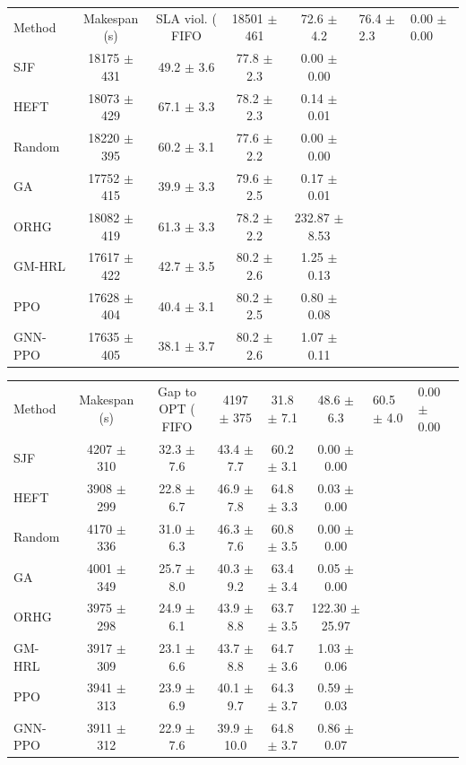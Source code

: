 \begin{tabular}{lcccc}
\toprule
Method & Makespan (s) & SLA viol. (%
\midrule
FIFO & 18501 $\pm$ 461 & 72.6 $\pm$ 4.2 & 76.4 $\pm$ 2.3 & 0.00 $\pm$ 0.00 \\
SJF & 18175 $\pm$ 431 & 49.2 $\pm$ 3.6 & 77.8 $\pm$ 2.3 & 0.00 $\pm$ 0.00 \\
HEFT & 18073 $\pm$ 429 & 67.1 $\pm$ 3.3 & 78.2 $\pm$ 2.3 & 0.14 $\pm$ 0.01 \\
Random & 18220 $\pm$ 395 & 60.2 $\pm$ 3.1 & 77.6 $\pm$ 2.2 & 0.00 $\pm$ 0.00 \\
GA & 17752 $\pm$ 415 & 39.9 $\pm$ 3.3 & 79.6 $\pm$ 2.5 & 0.17 $\pm$ 0.01 \\
ORHG & 18082 $\pm$ 419 & 61.3 $\pm$ 3.3 & 78.2 $\pm$ 2.2 & 232.87 $\pm$ 8.53 \\
GM-HRL & 17617 $\pm$ 422 & 42.7 $\pm$ 3.5 & 80.2 $\pm$ 2.6 & 1.25 $\pm$ 0.13 \\
PPO & 17628 $\pm$ 404 & 40.4 $\pm$ 3.1 & 80.2 $\pm$ 2.5 & 0.80 $\pm$ 0.08 \\
GNN-PPO & 17635 $\pm$ 405 & 38.1 $\pm$ 3.7 & 80.2 $\pm$ 2.6 & 1.07 $\pm$ 0.11 \\
\bottomrule
\end{tabular}

\begin{tabular}{lccccc}
\toprule
Method & Makespan (s) & Gap to OPT (%
\midrule
FIFO & 4197 $\pm$ 375 & 31.8 $\pm$ 7.1 & 48.6 $\pm$ 6.3 & 60.5 $\pm$ 4.0 & 0.00 $\pm$ 0.00 \\
SJF & 4207 $\pm$ 310 & 32.3 $\pm$ 7.6 & 43.4 $\pm$ 7.7 & 60.2 $\pm$ 3.1 & 0.00 $\pm$ 0.00 \\
HEFT & 3908 $\pm$ 299 & 22.8 $\pm$ 6.7 & 46.9 $\pm$ 7.8 & 64.8 $\pm$ 3.3 & 0.03 $\pm$ 0.00 \\
Random & 4170 $\pm$ 336 & 31.0 $\pm$ 6.3 & 46.3 $\pm$ 7.6 & 60.8 $\pm$ 3.5 & 0.00 $\pm$ 0.00 \\
GA & 4001 $\pm$ 349 & 25.7 $\pm$ 8.0 & 40.3 $\pm$ 9.2 & 63.4 $\pm$ 3.4 & 0.05 $\pm$ 0.00 \\
ORHG & 3975 $\pm$ 298 & 24.9 $\pm$ 6.1 & 43.9 $\pm$ 8.8 & 63.7 $\pm$ 3.5 & 122.30 $\pm$ 25.97 \\
GM-HRL & 3917 $\pm$ 309 & 23.1 $\pm$ 6.6 & 43.7 $\pm$ 8.8 & 64.7 $\pm$ 3.6 & 1.03 $\pm$ 0.06 \\
PPO & 3941 $\pm$ 313 & 23.9 $\pm$ 6.9 & 40.1 $\pm$ 9.7 & 64.3 $\pm$ 3.7 & 0.59 $\pm$ 0.03 \\
GNN-PPO & 3911 $\pm$ 312 & 22.9 $\pm$ 7.6 & 39.9 $\pm$ 10.0 & 64.8 $\pm$ 3.7 & 0.86 $\pm$ 0.07 \\
\bottomrule
\end{tabular}

